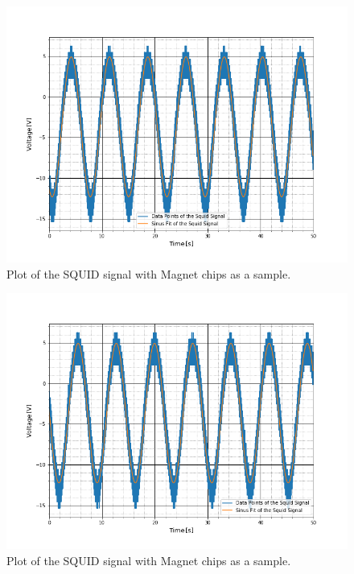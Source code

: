 \begin{figure}[ht]
	\includegraphics[scale=0.5]{Bild/P3_1}
	\centering
	\caption[SQUID signal of Magnet Chips 1]{Plot of the SQUID signal with Magnet chips as a sample.}
\end{figure}
\begin{figure}[ht]
	\includegraphics[scale=0.5]{Bild/P3_2}
	\centering
	\caption[SQUID signal of Magnet Chips 2]{Plot of the SQUID signal with Magnet chips as a sample.}
\end{figure}
